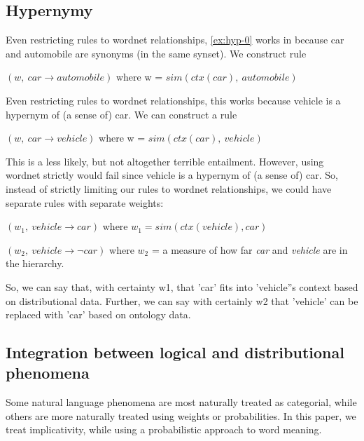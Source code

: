 \subsection*{Hypernymy}

	
Even restricting rules to wordnet relationships, \eqref{ex:hyp-0} works in
because car and automobile are synonyms (in the same synset).
We construct rule 

$(w,~ car \to automobile)$ where w = $sim(ctx(car),~ automobile)$


Even restricting rules to wordnet relationships, this works because vehicle
is a hypernym of (a sense of) car.
We can construct a rule 

$(w,~ car \to vehicle)$ where w = $sim(ctx(car),~ vehicle)$


This is a less likely, but not altogether terrible entailment.
However, using wordnet strictly would fail since vehicle is a hypernym of (a
sense of) car.
So, instead of strictly limiting our rules to wordnet relationships, we could
have separate rules with separate weights:

$(w_1,~ vehicle \to car)$ where $w_1 = sim(ctx(vehicle), car)$ 

$(w_2,~ vehicle \to \lnot car)$ where $w_2$ = a measure of how far {\it car} and
{\it vehicle} are in the hierarchy.

So, we can say that, with certainty w1, that 'car' fits into 'vehicle''s context
based on distributional data.
Further, we can say with certainly w2 that 'vehicle' can be replaced with 'car'
based on ontology data.



\subsection*{Integration between logical and distributional phenomena}



Some natural language phenomena are most naturally treated as categorial, while
others are more naturally treated using weights or probabilities. In this paper,
we treat implicativity, while using a probabilistic approach to word meaning.



